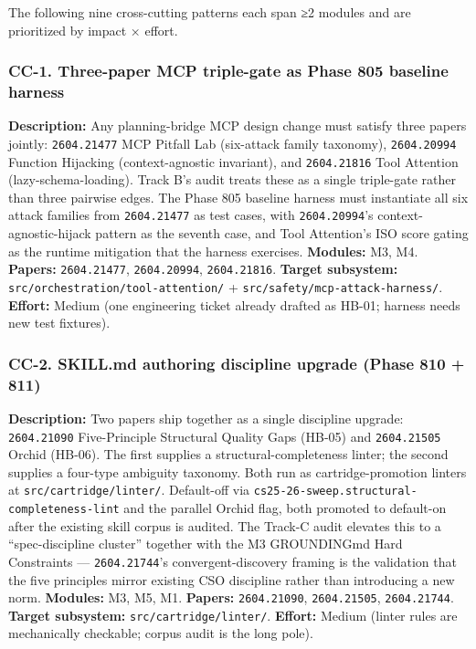 \documentclass[11pt,letterpaper]{article}
\newcommand{\arxivid}[1]{\texttt{\textcolor{accent}{#1}}}
\begin{document}
The following nine cross-cutting patterns each span ≥2 modules and are
prioritized by impact × effort.

\subsubsection{CC-1. Three-paper MCP triple-gate as Phase 805 baseline
harness}

\textbf{Description:} Any planning-bridge MCP design change must satisfy
three papers jointly: \arxivid{2604.21477} MCP Pitfall Lab (six-attack
family taxonomy), \arxivid{2604.20994} Function Hijacking
(context-agnostic invariant), and \arxivid{2604.21816} Tool Attention
(lazy-schema-loading). Track B's audit treats these as a single
triple-gate rather than three pairwise edges. The Phase 805 baseline
harness must instantiate all six attack families from
\arxivid{2604.21477} as test cases, with \arxivid{2604.20994}'s
context-agnostic-hijack pattern as the seventh case, and Tool
Attention's ISO score gating as the runtime mitigation that the harness
exercises. \textbf{Modules:} M3, M4. \textbf{Papers:} \arxivid{2604.21477},
\arxivid{2604.20994}, \arxivid{2604.21816}. \textbf{Target subsystem:}
\texttt{src/orchestration/tool-attention/} +
\texttt{src/safety/mcp-attack-harness/}. \textbf{Effort:} Medium (one
engineering ticket already drafted as HB-01; harness needs new test
fixtures).

\subsubsection{CC-2. SKILL.md authoring discipline upgrade (Phase 810 +
811)}

\textbf{Description:} Two papers ship together as a single discipline
upgrade: \arxivid{2604.21090} Five-Principle Structural Quality Gaps
(HB-05) and \arxivid{2604.21505} Orchid (HB-06). The first supplies a
structural-completeness linter; the second supplies a four-type
ambiguity taxonomy. Both run as cartridge-promotion linters at
\texttt{src/cartridge/linter/}. Default-off via
\texttt{cs25-26-sweep.structural-completeness-lint} and the parallel
Orchid flag, both promoted to default-on after the existing skill corpus
is audited. The Track-C audit elevates this to a ``spec-discipline
cluster'' together with the M3 GROUNDINGmd Hard Constraints ---
\arxivid{2604.21744}'s convergent-discovery framing is the validation
that the five principles mirror existing CSO discipline rather than
introducing a new norm. \textbf{Modules:} M3, M5, M1. \textbf{Papers:}
\arxivid{2604.21090}, \arxivid{2604.21505}, \arxivid{2604.21744}. \textbf{Target subsystem:}
\texttt{src/cartridge/linter/}. \textbf{Effort:} Medium (linter rules
are mechanically checkable; corpus audit is the long pole).
\end{document}
